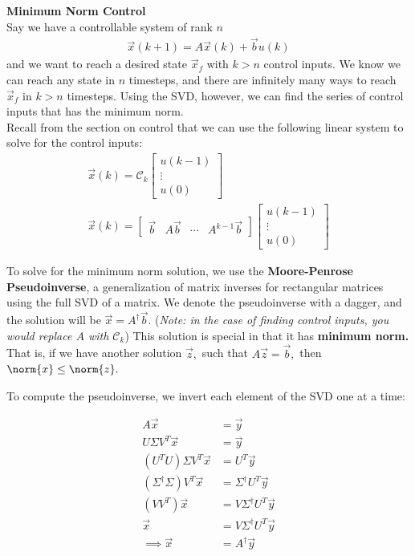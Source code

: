 \newpage
\textbf{Minimum Norm Control} \\
Say we have a controllable system of rank $n$
\begin{align*}
    \vec{x}(k + 1) = A\vec{x}(k) + \vec{b}u(k)
\end{align*}
 and we want to reach a desired state $\vec{x}_f$ with $k > n$ control inputs. We know we can reach any state in $n$ timesteps, and there are infinitely many ways to reach $\vec{x}_f$ in $k > n$ timesteps. Using the SVD, however, we can find the series of control inputs that has the minimum norm. \\
 \newline
 Recall from the section on control that we can use the following linear system to solve for the control inputs:
 \begin{align*}
    \vec{x}(k) = \mathcal{C}_k \begin{bmatrix}
        u(k - 1) \\ \vdots \\ u(0)
    \end{bmatrix} \\
    \vec{x}(k) = \begin{bmatrix}
        \vec{b} & A\vec{b} & \cdots & A^{k - 1} \vec{b}
    \end{bmatrix} \begin{bmatrix}
        u(k - 1) \\ \vdots \\ u(0)
    \end{bmatrix}
 \end{align*}

To solve for the minimum norm solution, we use the \textbf{Moore-Penrose Pseudoinverse}, a generalization of matrix inverses for rectangular matrices using the full SVD of a matrix. We denote the pseudoinverse with a dagger, and the solution will be $\vec{x} = A^{\dagger} \vec{b}.$ (\textit{Note: in the case of finding control inputs, you would replace $A$ with $\mathcal{C}_k$})
This solution is special in that it has \textbf{minimum norm.} That is, if we have another solution $\vec{z},$ such that $A \vec{z} = \vec{b},$ then $\norm{x} \leq \norm{z}.$

To compute the pseudoinverse, we invert each element of the SVD one at a time:

\begin{align*}
    A \vec{x} &= \vec{y} \\
    U \Sigma V^T \vec{x} &= \vec{y} \\
    (U^T U) \Sigma V^T \vec{x} &= U^T \vec{y} \\
    (\Sigma^{\dagger} \Sigma) V^T \vec{x} &= \Sigma^{\dagger} U^T \vec{y} \\
    (V V^T) \vec{x} &= V \Sigma^{\dagger} U^T \vec{y} \\
    \vec{x} &= V \Sigma^{\dagger} U^T \vec{y} \\
    \implies \vec{x} &= A^{\dagger} \vec{y}
\end{align*}


